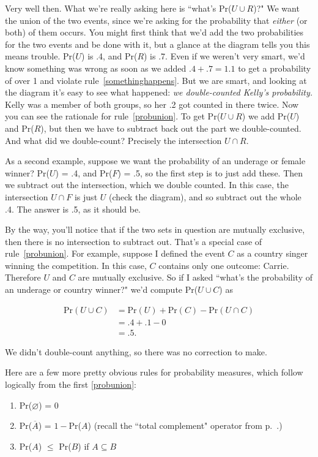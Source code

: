 Very well then. What we're really asking here is ``what's Pr($U \cup R$)?"
We want the union of the two events, since we're asking for the probability
that \textit{either} (or both) of them occurs. You might first think that
we'd add the two probabilities for the two events and be done with it, but
a glance at the diagram tells you this means trouble. Pr($U$) is .4, and
Pr($R$) is .7. Even if we weren't very smart, we'd know something was wrong
as soon as we added $.4 + .7 = 1.1$ to get a probability of over 1 and
violate rule~\ref{somethinghappens}. But we are smart, and looking at the
diagram it's easy to see what happened: \textit{we double-counted Kelly's
probability.} Kelly was a member of both groups, so her .2 got counted in
there twice. Now you can see the rationale for rule~\ref{probunion}. To get
Pr($U \cup R$) we add Pr($U$) and Pr($R$), but then we have to subtract
back out the part we double-counted. And what did we double-count?
Precisely the intersection $U \cap R$.

As a second example, suppose we want the probability of an underage or
female winner? Pr($U$) = .4, and Pr($F$) = .5, so the first step is to just
add these. Then we subtract out the intersection, which we double counted.
In this case, the intersection $U \cap F$ is just $U$ (check the diagram),
and so subtract out the whole .4. The answer is .5, as it should be.

By the way, you'll notice that if the two sets in question are mutually
exclusive, then there is no intersection to subtract out. That's a special
case of rule~\ref{probunion}. For example, suppose I defined the event $C$
as a country singer winning the competition. In this case, $C$ contains
only one outcome: Carrie. Therefore $U$ and $C$ are mutually exclusive. So
if I asked ``what's the probability of an underage or country winner?" we'd
compute Pr($U \cup C$) as 

\begin{align*}
\text{Pr}(U \cup C) &= \text{Pr}(U) + \text{Pr}(C) - \text{Pr}(U \cap C) \\
&= .4 + .1 - 0 \\
&= .5.
\end{align*}

We didn't double-count anything, so there was no correction to make.

Here are a few more pretty obvious rules for probability measures, which
follow logically from the first \ref{probunion}:

\begin{enumerate}[resume]
\item Pr($\varnothing$) = 0 
\item Pr($\overline{A}$) = $1-$Pr($A$) \quad (recall the ``total complement"
operator from p.~\pageref{complement}.)
\item Pr($A$) $\leq$ Pr($B$) if $A \subseteq B$
\end{enumerate}

